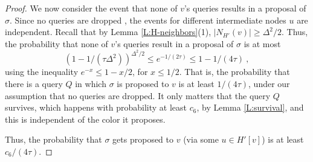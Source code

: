\begin{proof}
We now consider the event that none of $v$'s queries results in a proposal of $\sigma$. Since no queries are dropped , the events for different intermediate nodes $u$ are independent.
Recall that by Lemma \ref{L:H-neighbors}(1), $|N_{H'}(v)| \ge \Delta^2/2$.
Thus, the probability that none of $v$'s queries result in a proposal of $\sigma$ is at most
\[ (1-1/(\tau\Delta^2))^{\Delta^2/2} \le  e^{-1/(2\tau)} \le 1-1/(4\tau)\ , \]
using the inequality $e^{-x} \le 1-x/2$, for $x \le 1/2$.
That is, the probability that there is a query $Q$ in which $\sigma$ is proposed to $v$ is at least $1/(4\tau)$, under our assumption that no queries are dropped.
It only matters that the query $Q$ survives, which happens with probability at least $c_6$, by Lemma \ref{L:survival}, and this is independent of the color it proposes.

Thus, the probability that $\sigma$ gets proposed to $v$ (via some $u \in H'[v]$) is at least 
$c_6/(4\tau)$.
\end{proof}

